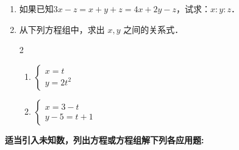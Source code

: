 \begin{enumerate}
\item 如果已知$3x-z=x+y+z=4x+2y-z$，试求：$x:y:z$．

\item 从下列方程组中，求出 $x,y$ 之间的关系式．
\begin{multicols}{2}
\begin{enumerate}
    \item $\begin{cases}
        x=t\\ y=2t^2
    \end{cases}$
    \item $\begin{cases}
        x=3-t\\ y-5=t+1
    \end{cases}$
\end{enumerate}
\end{multicols}

\end{enumerate}

\textbf{适当引入未知数，列出方程或方程组解下列各应用题:
}

